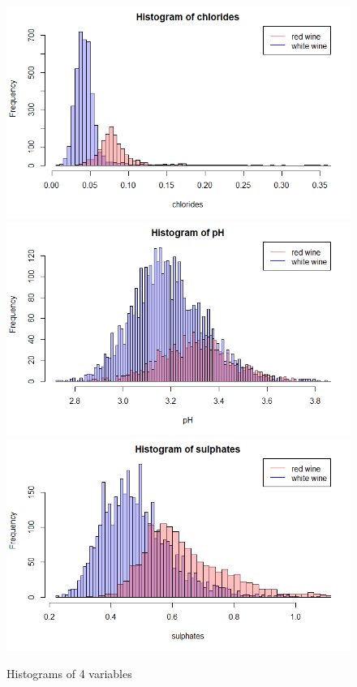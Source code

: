 \documentclass[10pt]{article}
\begin{document}
\begin{figure}[H]
\centering
\caption{Histograms of 4 variables}
\includegraphics[scale=0.4]{histogram_of_chlorides}
\includegraphics[scale=0.4]{histogram_of_pH}
\includegraphics[scale=0.4]{histogram_of_sulphates}

\end{figure}
\end{document}
